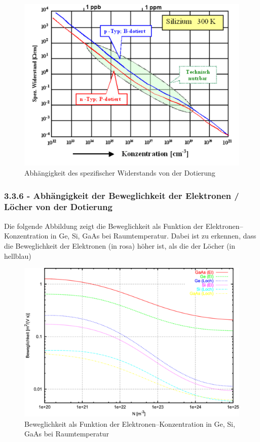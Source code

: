 \documentclass[a4paper]{scrartcl}
\numberwithin{equation}{subsection}
\begin{document}
\begin{figure}[H]
\includegraphics[width=12cm]{spezifischer_Widerstand_Silizium}
\centering
\caption{Abhängigkeit des spezifischer Widerstands von der Dotierung \protect\footnotemark}
\centering
\label{fig:spezifischer-widerstand-silizium}
\end{figure}


\subsubsection{3.3.6 - Abhängigkeit der Beweglichkeit der Elektronen / Löcher von der Dotierung}
Die folgende Abbildung zeigt die Beweglichkeit als Funktion der Elektronen–Konzentration in Ge, Si, GaAs bei Raumtemperatur. Dabei ist zu erkennen, dass die Beweglichkeit der Elektronen (in rosa) höher ist, als die der Löcher (in hellblau)

\begin{figure}[H]
\includegraphics[width=12cm]{beweglichkeit-Silizium}
\centering
\caption{Beweglichkeit als Funktion der Elektronen–Konzentration in Ge, Si, GaAs bei Raumtemperatur \protect\footnotemark}
\centering
\label{fig:beweglichkeit-silizium}
\end{figure}
\end{document}
